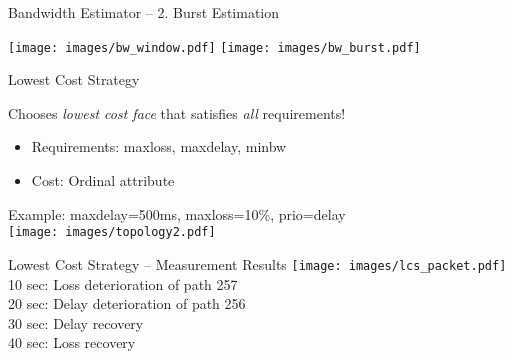 \begin{frame}{Bandwidth Estimator -- 2. Burst Estimation}
		\vspace*{-2em}
\begin{center}
	\texttt{[image: images/bw\_window.pdf]}
	\vspace*{.8em}
	\texttt{[image: images/bw\_burst.pdf]}
\end{center}
\end{frame}


\begin{frame}{Lowest Cost Strategy}
	\vspace*{-1.5em}
	\begin{block}{Chooses \emph{lowest cost face} that satisfies \emph{all} requirements!}
		\begin{itemize}
			\item Requirements: maxloss, maxdelay, minbw
			\item Cost: Ordinal attribute
		\end{itemize}
	\end{block}
	Example: maxdelay=500ms, maxloss=10\%, prio=delay\\[.5em]
			\texttt{[image: images/topology2.pdf]}
\end{frame}

\begin{frame}{Lowest Cost Strategy -- Measurement Results}
	\vspace*{-2em}
	\texttt{[image: images/lcs\_packet.pdf]}\\[.1em]
		10 sec: Loss deterioration of path 257\\
		20 sec: Delay deterioration of path 256\\
		30 sec: Delay recovery\\ 
		40 sec: Loss recovery
\end{frame}

